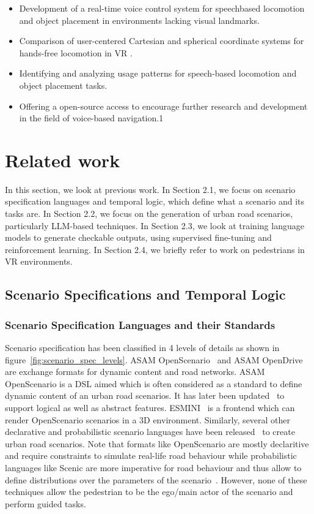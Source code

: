 \documentclass[preprint,12pt]{elsarticle}
\newcommand{\reftext}[1]{{\color{gray}#1}}   %
\begin{document}
\begin{itemize}
\item \reftext{Development of a real-time voice control system for speechbased locomotion and object placement in environments lacking visual landmarks.}
\item \reftext{Comparison of user-centered Cartesian and spherical coordinate systems for hands-free locomotion in VR .}
\item \reftext{Identifying and analyzing usage patterns for speech-based locomotion and object placement tasks.}
\item \reftext{Offering a open-source access to encourage further research and development in the field of voice-based navigation.1}
\end{itemize}

\section{Related work}

In this section, we look at previous work. In Section 2.1, we focus on scenario specification languages and temporal logic, which define what a scenario and its tasks are. In Section 2.2, we focus on the generation of urban road scenarios, particularly LLM-based techniques. In Section 2.3, we look at training language models to generate checkable outputs, using supervised fine-tuning and reinforcement learning. In Section 2.4, we briefly refer to work on pedestrians in VR environments.

\subsection{Scenario Specifications and Temporal Logic}
\subsubsection{Scenario Specification Languages and their Standards}
Scenario specification has been classified in 4 levels of details as shown in figure~\ref{fig:scenario_spec_levels}. ASAM OpenScenario~\cite{asam_openscenario} and ASAM OpenDrive~\cite{todo} are exchange formats for dynamic content and road networks. ASAM OpenScenario is a DSL aimed which is often considered as a standard to define dynamic content of an urban road scenarios. It has later been updated~\cite{todo cite openscenario 2} to support logical as well as abstract features. ESMINI~\cite{todo cite esmini} is a frontend which can render OpenScenario scenarios in a 3D environment. Similarly, several other declarative and probabilistic scenario languages have been released~\cite{fremont2019scenic,vin2023scenic3,4JPQ8JTG,J3YJDXUH,VYKWQ4VL,YBT8TZBC,JMP3L7FI,SPU4TMNS,CB7JIPN2,todo cite geoscenario} to create urban road scenarios. Note that formats like OpenScenario are mostly declaritive and require constraints to simulate real-life road behaviour while probabilistic languages like Scenic are more imperative for road behaviour and thus allow to define distributions over the parameters of the scenario~\cite{molin2023specguided}. However, none of these techniques allow the pedestrian to be the ego/main actor of the scenario and perform guided tasks. 
\end{document}
